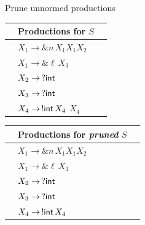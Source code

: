 \documentclass[10pt]{beamer}
\begin{document}
\begin{frame} {Prune unnormed productions}
	\vspace*{-2mm}
	\hspace*{5mm}\begin{tabular}{l l l }
 		&Productions for $S$&  \\ \hline
 	 	&$X_1 \rightarrow \& n\, X_1 X_1 X_2$ &\\
 	 	&$X_1 \rightarrow \& \ell\, X_3$ &\\
 	 	&$X_2 \rightarrow \,? \mathsf{int}$&\\
 	 	&$X_3 \rightarrow \,? \mathsf{int}$&\\
        &$X_4 \rightarrow \,!\mathsf{int}\, X_4$ {\color{red} $X_4$ } &\\                   
	\end{tabular}
	\hspace*{1cm} \pause
	\begin{tabular}{l l l }
 		&Productions for \emph{pruned} $S$&  \\ \hline
  		&\hspace*{4mm}$X_1 \rightarrow \& n\, X_1 X_1 X_2$ & \\
  		&\hspace*{4mm}$X_1 \rightarrow \& \ell\, X_3$ &\\
 		&\hspace*{4mm}$X_2 \rightarrow \,? \mathsf{int}$&\\
  		&\hspace*{4mm}$X_3 \rightarrow \,? \mathsf{int}$&\\
  		&\hspace*{4mm}$X_4 \rightarrow \,!\mathsf{int}\, X_4 $ &\\
	\end{tabular}
 	\vspace*{2mm}
\end{frame}


\end{document}
